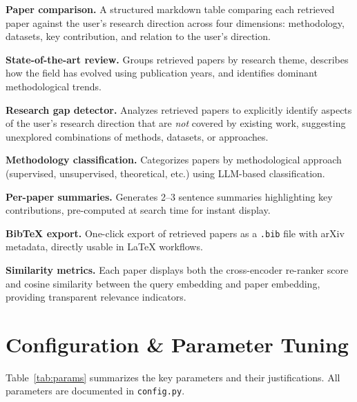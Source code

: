 \documentclass[11pt,a4paper]{article}
\begin{document}
\textbf{Paper comparison.} A structured markdown table comparing each retrieved paper against the user's research direction across four dimensions: methodology, datasets, key contribution, and relation to the user's direction.

\textbf{State-of-the-art review.} Groups retrieved papers by research theme, describes how the field has evolved using publication years, and identifies dominant methodological trends.

\textbf{Research gap detector.} Analyzes retrieved papers to explicitly identify aspects of the user's research direction that are \emph{not} covered by existing work, suggesting unexplored combinations of methods, datasets, or approaches.

\textbf{Methodology classification.} Categorizes papers by methodological approach (supervised, unsupervised, theoretical, etc.) using LLM-based classification.

\textbf{Per-paper summaries.} Generates 2--3 sentence summaries highlighting key contributions, pre-computed at search time for instant display.

\textbf{BibTeX export.} One-click export of retrieved papers as a \texttt{.bib} file with arXiv metadata, directly usable in \LaTeX{} workflows.

\textbf{Similarity metrics.} Each paper displays both the cross-encoder re-ranker score and cosine similarity between the query embedding and paper embedding, providing transparent relevance indicators.

\section{Configuration \& Parameter Tuning}

Table~\ref{tab:params} summarizes the key parameters and their justifications. All parameters are documented in \texttt{config.py}.
\end{document}
